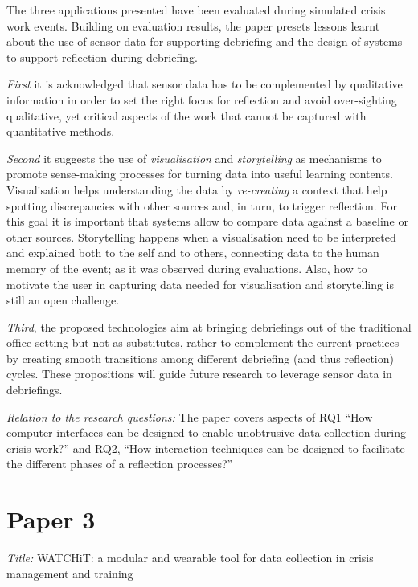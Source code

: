 The three applications presented have been evaluated during simulated crisis work events. Building on evaluation results, the paper presets lessons learnt about the use of sensor data for supporting debriefing and the design of systems to support reflection during debriefing. 

\emph{First} it is acknowledged that sensor data has to be complemented by qualitative information in order to set the right focus for reflection and avoid over-sighting qualitative, yet critical aspects of the work that cannot be captured with quantitative methods.

\emph{Second} it suggests the use of \emph{visualisation} and \emph{storytelling} as mechanisms to promote sense-making processes for turning data into useful learning contents. Visualisation helps understanding the data by \emph{re-creating} a context that help spotting discrepancies with other sources and, in turn, to trigger reflection. For this goal it is important that systems allow to compare data against a baseline or other sources. Storytelling happens when a visualisation need to be interpreted and explained both to the self and to others, connecting data to the human memory of the event; as it was observed during evaluations. Also, how to motivate the user in capturing data needed for visualisation and storytelling is still an open challenge.

\emph{Third}, the proposed technologies aim at bringing debriefings out of the traditional office setting but not as substitutes, rather to complement the current practices by creating smooth transitions among different debriefing (and thus reflection) cycles. These propositions will guide future research to leverage sensor data in debriefings.

\emph{Relation to the research questions:} The paper covers aspects of RQ1 ``How computer interfaces can be designed to enable unobtrusive data collection during crisis work?'' and RQ2, ``How interaction techniques can be designed to facilitate the different phases of a reflection processes?''

\section[WATCHiT: a modular and wearable tool for data collection in crisis management and training]{Paper 3}\label{paper-3}

\emph{Title:} WATCHiT: a modular and wearable tool for data collection in crisis management and training

